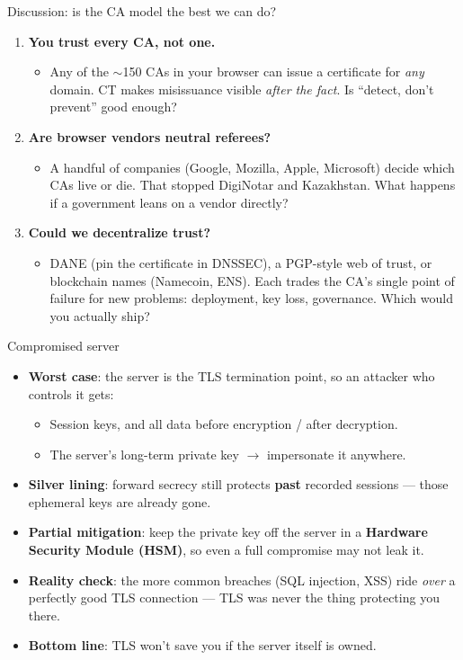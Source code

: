 \ifdefined\PRESENTATION\else\PassOptionsToClass{handout}{beamer}\fi\documentclass[aspectratio=169, lualatex]{beamer}
\begin{document}
\begin{frame}{Discussion: is the CA model the best we can do?}
	\begin{enumerate}
		\item \textbf{You trust every CA, not one.}
		      \begin{itemize}
			      \item Any of the $\sim$150 CAs in your browser can issue a certificate for \emph{any} domain. CT makes misissuance visible \emph{after the fact}. Is ``detect, don't prevent'' good enough?
		      \end{itemize}
		\item \textbf{Are browser vendors neutral referees?}
		      \begin{itemize}
			      \item A handful of companies (Google, Mozilla, Apple, Microsoft) decide which CAs live or die. That stopped DigiNotar and Kazakhstan. What happens if a government leans on a vendor directly?
		      \end{itemize}
		\item \textbf{Could we decentralize trust?}
		      \begin{itemize}
			      \item DANE (pin the certificate in DNSSEC), a PGP-style web of trust, or blockchain names (Namecoin, ENS). Each trades the CA's single point of failure for new problems: deployment, key loss, governance. Which would you actually ship?
		      \end{itemize}
	\end{enumerate}
\end{frame}

\begin{frame}{Compromised server}
	\begin{itemize}[<+->]
		\item \textbf{Worst case}: the server is the TLS termination point, so an attacker who controls it gets:
		      \begin{itemize}
			      \item Session keys, and all data before encryption / after decryption.
			      \item The server's long-term private key $\rightarrow$ impersonate it anywhere.
		      \end{itemize}
		\item \textbf{Silver lining}: forward secrecy still protects \textbf{past} recorded sessions --- those ephemeral keys are already gone.
		\item \textbf{Partial mitigation}: keep the private key off the server in a \textbf{Hardware Security Module (HSM)}, so even a full compromise may not leak it.
		\item \textbf{Reality check}: the more common breaches (SQL injection, XSS) ride \emph{over} a perfectly good TLS connection --- TLS was never the thing protecting you there.
		\item \textbf{Bottom line}: TLS won't save you if the server itself is owned.
	\end{itemize}
\end{frame}
\end{document}
